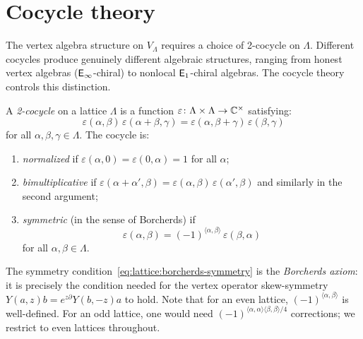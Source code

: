 \section{Cocycle theory}
\label{sec:lattice:cocycles}

The vertex algebra structure on $V_\Lambda$ requires a choice of
2-cocycle on $\Lambda$. Different cocycles produce genuinely different
algebraic structures, ranging from honest vertex algebras ($\mathsf{E}_{\infty}$-chiral)
to nonlocal $\mathsf{E}_1$-chiral algebras. The cocycle
theory controls this distinction.

\begin{definition}\label{def:lattice:2-cocycle}
A \emph{2-cocycle} on a lattice $\Lambda$ is a function
$\varepsilon \colon \Lambda \times \Lambda \to \mathbb{C}^\times$ satisfying:
\begin{equation}\label{eq:lattice:cocycle-condition}
\varepsilon(\alpha, \beta)\,\varepsilon(\alpha + \beta, \gamma)
= \varepsilon(\alpha, \beta + \gamma)\,\varepsilon(\beta, \gamma)
\end{equation}
for all $\alpha, \beta, \gamma \in \Lambda$.
The cocycle is:
\begin{enumerate}[label=(\roman*)]
\item \emph{normalized} if
  $\varepsilon(\alpha, 0) = \varepsilon(0, \alpha) = 1$ for all $\alpha$;
\item \emph{bimultiplicative} if
  $\varepsilon(\alpha + \alpha', \beta) =
  \varepsilon(\alpha, \beta)\,\varepsilon(\alpha', \beta)$
  and similarly in the second argument;
\item \emph{symmetric} (in the sense of Borcherds) if
\begin{equation}\label{eq:lattice:borcherds-symmetry}
\varepsilon(\alpha, \beta)
= (-1)^{\langle \alpha, \beta \rangle}\,\varepsilon(\beta, \alpha)
\end{equation}
for all $\alpha, \beta \in \Lambda$.
\end{enumerate}
\end{definition}

\begin{remark}\label{rem:lattice:symmetry-convention}
The symmetry condition~\eqref{eq:lattice:borcherds-symmetry} is the
\emph{Borcherds axiom}: it is precisely the condition needed for the
vertex operator skew-symmetry $Y(a,z)b = e^{z\partial}Y(b,-z)a$ to hold.
Note that for an even lattice, $(-1)^{\langle\alpha,\beta\rangle}$
is well-defined. For an odd lattice, one would need
$(-1)^{\langle\alpha,\alpha\rangle\langle\beta,\beta\rangle/4}$
corrections; we restrict to even lattices throughout.
\end{remark}

